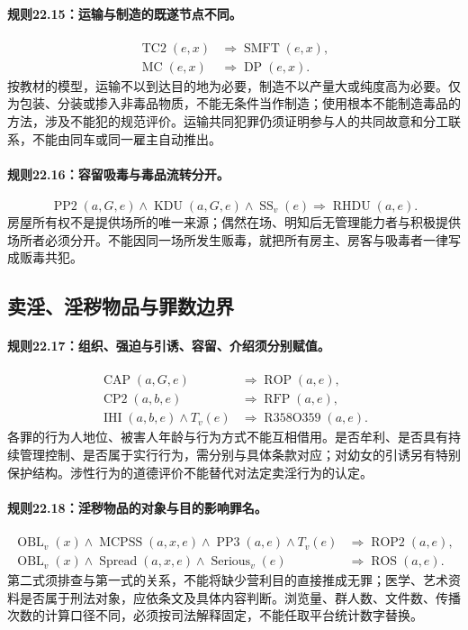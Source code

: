 \paragraph{规则22.15：运输与制造的既遂节点不同。}
\[
\begin{aligned}
\operatorname{TC2}(e,x)
&\Rightarrow\operatorname{SMFT}(e,x),\\
\operatorname{MC}(e,x)
&\Rightarrow\operatorname{DP}(e,x).
\end{aligned}
\]
按教材的模型，运输不以到达目的地为必要，制造不以产量大或纯度高为必要。仅为包装、分装或掺入非毒品物质，不能无条件当作制造；使用根本不能制造毒品的方法，涉及不能犯的规范评价。运输共同犯罪仍须证明参与人的共同故意和分工联系，不能由同车或同一雇主自动推出。

\paragraph{规则22.16：容留吸毒与毒品流转分开。}
\[
\operatorname{PP2}(a,G,e)\land\operatorname{KDU}(a,G,e)
\land\operatorname{SS}_v(e)
\Rightarrow\operatorname{RHDU}(a,e).
\]
房屋所有权不是提供场所的唯一来源；偶然在场、明知后无管理能力者与积极提供场所者必须分开。不能因同一场所发生贩毒，就把所有房主、房客与吸毒者一律写成贩毒共犯。

\subsection{卖淫、淫秽物品与罪数边界}
\paragraph{规则22.17：组织、强迫与引诱、容留、介绍须分别赋值。}
\[
\begin{aligned}
\operatorname{CAP}(a,G,e)
&\Rightarrow\operatorname{ROP}(a,e),\\
\operatorname{CP2}(a,b,e)
&\Rightarrow\operatorname{RFP}(a,e),\\
\operatorname{IHI}(a,b,e)\land T_v(e)
&\Rightarrow\operatorname{R358O359}(a,e).
\end{aligned}
\]
各罪的行为人地位、被害人年龄与行为方式不能互相借用。是否牟利、是否具有持续管理控制、是否属于实行行为，需分别与具体条款对应；对幼女的引诱另有特别保护结构。涉性行为的道德评价不能替代对法定卖淫行为的认定。

\paragraph{规则22.18：淫秽物品的对象与目的影响罪名。}
\[
\begin{aligned}
\operatorname{OBL}_v(x)\land\operatorname{MCPSS}(a,x,e)
\land\operatorname{PP3}(a,e)\land T_v(e)
&\Rightarrow\operatorname{ROP2}(a,e),\\
\operatorname{OBL}_v(x)\land\operatorname{Spread}(a,x,e)
\land\operatorname{Serious}_v(e)
&\Rightarrow\operatorname{ROS}(a,e).
\end{aligned}
\]
第二式须排查与第一式的关系，不能将缺少营利目的直接推成无罪；医学、艺术资料是否属于刑法对象，应依条文及具体内容判断。浏览量、群人数、文件数、传播次数的计算口径不同，必须按司法解释固定，不能任取平台统计数字替换。

